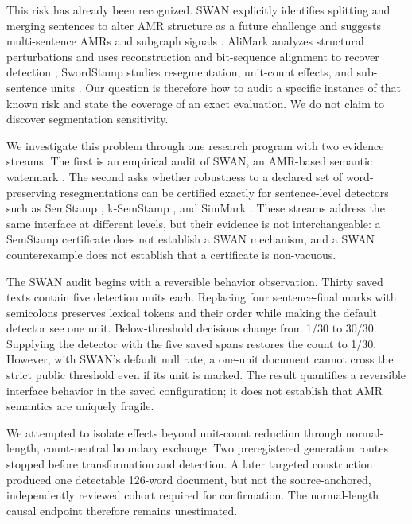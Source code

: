 \documentclass[10pt]{article}
\begin{document}
This risk has already been recognized. SWAN explicitly identifies splitting
and merging sentences to alter AMR structure as a future challenge and
suggests multi-sentence AMRs and subgraph signals \citep{ye2026swan}.
AliMark analyzes structural perturbations and uses reconstruction and
bit-sequence alignment to recover detection \citep{li2026alimark};
SwordStamp studies resegmentation, unit-count effects, and sub-sentence
units \citep{diaa2026swordstamp}. Our question is therefore how to audit a
specific instance of that known risk and state the coverage of an exact
evaluation. We do not claim to discover segmentation sensitivity.

We investigate this problem through one research program with two evidence
streams. The first is an empirical audit of SWAN, an AMR-based semantic
watermark \citep{ye2026swan}. The second asks whether robustness to a declared
set of word-preserving resegmentations can be certified exactly for
sentence-level detectors such as SemStamp \citep{hou2024semstamp},
k-SemStamp \citep{hou2024ksemstamp}, and SimMark
\citep{dabiriaghdam2025simmark}. These streams address the same interface at
different levels, but their evidence is not interchangeable: a SemStamp
certificate does not establish a SWAN mechanism, and a SWAN counterexample
does not establish that a certificate is non-vacuous.

The SWAN audit begins with a reversible behavior observation. Thirty saved
texts contain five detection units each. Replacing four sentence-final marks
with semicolons preserves lexical tokens and their order while making the
default detector see one unit. Below-threshold decisions change from 1/30 to
30/30. Supplying the detector with the five saved spans restores the count to
1/30. However, with SWAN's default null rate, a one-unit document cannot
cross the strict public threshold even if its unit is marked. The result
quantifies a reversible interface behavior in the saved configuration; it
does not establish that AMR semantics are uniquely fragile.

We attempted to isolate effects beyond unit-count reduction through
normal-length, count-neutral boundary exchange. Two preregistered generation
routes stopped before transformation and detection. A later targeted
construction produced one detectable 126-word document, but not the
source-anchored, independently reviewed cohort required for confirmation. The
normal-length causal endpoint therefore remains unestimated.
\end{document}

